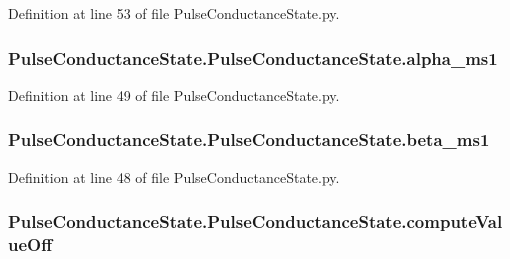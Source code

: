 Definition at line 53 of file Pulse\-Conductance\-State.\-py.

\hypertarget{class_pulse_conductance_state_1_1_pulse_conductance_state_a5fe4e2c9035df43a1e8eb9d66d669e14}{
\subsubsection[{alpha\-\_\-ms1}]{\setlength{\rightskip}{0pt plus 5cm}Pulse\-Conductance\-State.\-Pulse\-Conductance\-State.\-alpha\-\_\-ms1}}\label{class_pulse_conductance_state_1_1_pulse_conductance_state_a5fe4e2c9035df43a1e8eb9d66d669e14}


Definition at line 49 of file Pulse\-Conductance\-State.\-py.

\hypertarget{class_pulse_conductance_state_1_1_pulse_conductance_state_a8ebc0c29d97fa09699d7dfb724e94f82}{
\subsubsection[{beta\-\_\-ms1}]{\setlength{\rightskip}{0pt plus 5cm}Pulse\-Conductance\-State.\-Pulse\-Conductance\-State.\-beta\-\_\-ms1}}\label{class_pulse_conductance_state_1_1_pulse_conductance_state_a8ebc0c29d97fa09699d7dfb724e94f82}


Definition at line 48 of file Pulse\-Conductance\-State.\-py.

\hypertarget{class_pulse_conductance_state_1_1_pulse_conductance_state_a89e0cc154bd699aee7529574a8fe556c}{
\subsubsection[{compute\-Value\-Off}]{\setlength{\rightskip}{0pt plus 5cm}Pulse\-Conductance\-State.\-Pulse\-Conductance\-State.\-compute\-Value\-Off}}\label{class_pulse_conductance_state_1_1_pulse_conductance_state_a89e0cc154bd699aee7529574a8fe556c}



